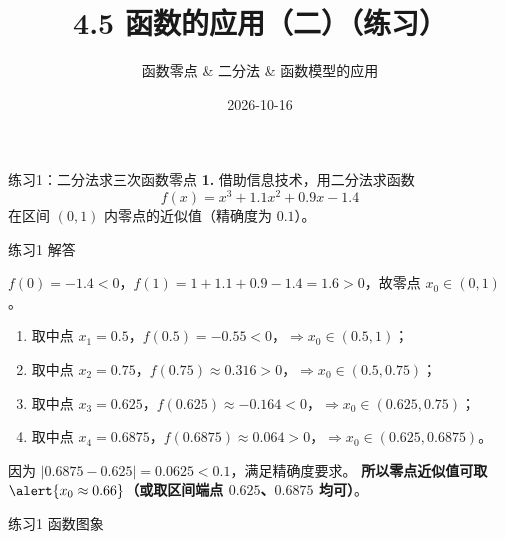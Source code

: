 \documentclass[10pt,aspectratio=169,serif]{beamer}
\title[4.5 函数的应用（二）练习]{4.5 函数的应用（二）（练习）}
\subtitle{函数零点 \& 二分法 \& 函数模型的应用}
\author{}
\institute{}
\date{2026-10-16}
\begin{document}
\begin{frame}
  \titlepage
\end{frame}

\begin{frame}[t]{练习1：二分法求三次函数零点}
\textbf{1.} 借助信息技术，用二分法求函数
\[
f(x)=x^{3}+1.1x^{2}+0.9x-1.4
\]
在区间 $(0,1)$ 内零点的近似值（精确度为 $0.1$）。
\end{frame}

\begin{frame}[t]{练习1 解答}
\vspace{-1em}
\begin{tcolorbox}[colback=orange!10,colframe=orange,title=\textbf{解}]
$f(0)=-1.4<0$，$f(1)=1+1.1+0.9-1.4=1.6>0$，故零点 $x_{0}\in(0,1)$。
\smallskip
\begin{enumerate}
  \item 取中点 $x_{1}=0.5$，$f(0.5)=-0.55<0$，$\Rightarrow x_{0}\in(0.5,1)$；
  \item 取中点 $x_{2}=0.75$，$f(0.75)\approx 0.316>0$，$\Rightarrow x_{0}\in(0.5,0.75)$；
  \item 取中点 $x_{3}=0.625$，$f(0.625)\approx -0.164<0$，$\Rightarrow x_{0}\in(0.625,0.75)$；
  \item 取中点 $x_{4}=0.6875$，$f(0.6875)\approx 0.064>0$，$\Rightarrow x_{0}\in(0.625,0.6875)$。
\end{enumerate}
因为 $|0.6875-0.625|=0.0625<0.1$，满足精确度要求。
\smallskip
\textbf{所以零点近似值可取 } $\alert{x_{0}\approx 0.66}$\textbf{（或取区间端点 $0.625$、$0.6875$ 均可）}。
\end{tcolorbox}
\end{frame}

\begin{frame}[t]{练习1 函数图象}
\begin{center}
\end{center}
\end{frame}
\end{document}
